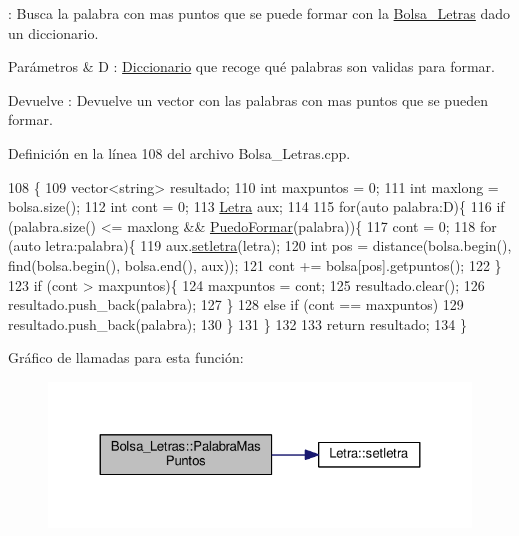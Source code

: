 \+: Busca la palabra con mas puntos que se puede formar con la \hyperlink{classBolsa__Letras}{Bolsa\+\_\+\+Letras} dado un diccionario. 


\begin{DoxyParams}{Parámetros}
{\em } & D \+: \hyperlink{classDiccionario}{Diccionario} que recoge qué palabras son validas para formar. \\
\hline
\end{DoxyParams}
\begin{DoxyReturn}{Devuelve}
\+: Devuelve un vector con las palabras con mas puntos que se pueden formar. 
\end{DoxyReturn}


Definición en la línea 108 del archivo Bolsa\+\_\+\+Letras.\+cpp.


\begin{DoxyCode}
108                                                                   \{
109     vector<string> resultado;
110     \textcolor{keywordtype}{int} maxpuntos = 0;
111     \textcolor{keywordtype}{int} maxlong = bolsa.size();
112     \textcolor{keywordtype}{int} cont = 0;
113     \hyperlink{classLetra}{Letra} aux;
114 
115     \textcolor{keywordflow}{for}(\textcolor{keyword}{auto} palabra:D)\{
116         \textcolor{keywordflow}{if} (palabra.size() <= maxlong && \hyperlink{classBolsa__Letras_a6a611cf986750285ec11da71275199e2}{PuedoFormar}(palabra))\{
117             cont = 0;
118             \textcolor{keywordflow}{for} (\textcolor{keyword}{auto} letra:palabra)\{
119                 aux.\hyperlink{classLetra_a60bee0a9f4fd060146a9bc6711d728c4}{setletra}(letra);
120                 \textcolor{keywordtype}{int} pos = distance(bolsa.begin(), find(bolsa.begin(), bolsa.end(), aux));
121                 cont += bolsa[pos].getpuntos();
122             \}
123             \textcolor{keywordflow}{if} (cont > maxpuntos)\{
124                 maxpuntos = cont;
125                 resultado.clear();
126                 resultado.push\_back(palabra);
127             \}
128             \textcolor{keywordflow}{else} \textcolor{keywordflow}{if} (cont == maxpuntos)
129                 resultado.push\_back(palabra);
130         \}
131     \}
132 
133     \textcolor{keywordflow}{return} resultado;
134 \}
\end{DoxyCode}


Gráfico de llamadas para esta función\+:
\nopagebreak
\begin{figure}[H]
\begin{center}
\leavevmode
\includegraphics[width=324pt]{classBolsa__Letras_a81cff895a837816fa37aa573ec9a450d_cgraph}
\end{center}
\end{figure}



